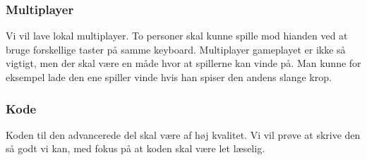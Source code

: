 \subsubsection*{Multiplayer}
Vi vil lave lokal multiplayer. To personer skal kunne spille mod hianden ved at bruge forskellige taster på samme keyboard.  Multiplayer gameplayet er ikke så vigtigt, men der skal være en måde hvor at spillerne kan vinde på. Man kunne for eksempel lade den ene spiller vinde hvis han spiser den andens slange krop.

\subsubsection*{Kode}
Koden til den advancerede del skal være af høj kvalitet. Vi vil prøve at skrive den så godt vi kan, med fokus på at koden skal være let læselig.
